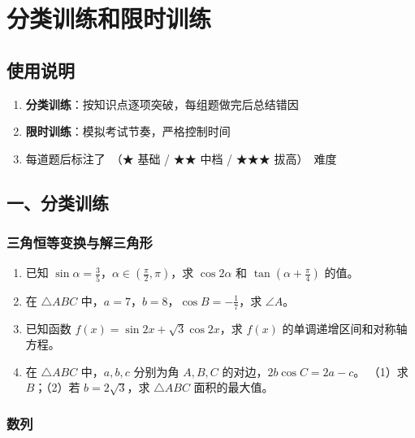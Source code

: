 \section{分类训练和限时训练}

\subsection{使用说明}

\begin{enumerate}
  \item \textbf{分类训练}：按知识点逐项突破，每组题做完后总结错因
  \item \textbf{限时训练}：模拟考试节奏，严格控制时间
  \item 每道题后标注了\ （★ 基础 / ★★ 中档 / ★★★ 拔高）\ 难度
\end{enumerate}

\subsection{一、分类训练}

\subsubsection{三角恒等变换与解三角形}

\begin{enumerate}
  \item[★] 已知 $\sin\alpha = \frac35$，$\alpha\in(\frac{\pi}{2},\pi)$，求 $\cos2\alpha$ 和 $\tan(\alpha+\frac{\pi}{4})$ 的值。
  \vspace{1cm}

  \item[★] 在 $\triangle ABC$ 中，$a=7$，$b=8$，$\cos B = -\frac17$，求 $\angle A$。
  \vspace{1cm}

  \item[★★] 已知函数 $f(x) = \sin2x + \sqrt{3}\cos2x$，求 $f(x)$ 的单调递增区间和对称轴方程。
  \vspace{1cm}

  \item[★★] 在 $\triangle ABC$ 中，$a,b,c$ 分别为角 $A,B,C$ 的对边，$2b\cos C = 2a - c$。
  （1）求 $B$；（2）若 $b=2\sqrt{3}$，求 $\triangle ABC$ 面积的最大值。
  \vspace{2cm}
\end{enumerate}

\subsubsection{数列}

